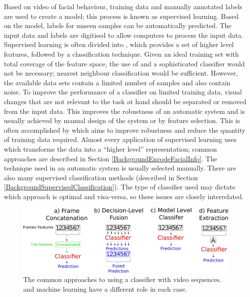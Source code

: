 Based on video of facial behaviour, training data and manually annotated labels are used to create a model; this process is known as supervised learning. Based on the model, labels for unseen samples can be automatically predicted. The input data and labels are digitised to allow computers to process the input data. Supervised learning is often divided into \featureGeneration, which provides a set of higher level features, followed by a classification technique. 
Given an ideal training set with total coverage of the feature space, the use of \featureGeneration and a sophisticated classifier would not be necessary; nearest neighbour classification \cite{Cover1967} would be sufficient. However, the available data sets contain a limited number of samples and also contain noise. To improve the performance of a classifier on limited training data, visual changes that are not relevant to the task at hand should be separated or removed from the input data. This improves the robustness of an automatic system and is usually achieved by manual design of the system or by feature selection. This is often accomplished by \featureGenerationComma which aims to improve robustness and reduce the quantity of training data required. Almost every application of supervised learning uses \featureGeneration which transforms the data into a ``higher level'' representation; common approaches are described in Section \ref{BackgroundEncodeFacialInfo}. The \featureGeneration technique used in an automatic system is usually selected manually. There are also many supervised classification methods (described in Section \ref{BackgroundSupervisedClassification}). The type of classifier used may dictate which \featureGeneration approach is optimal and visa-versa, so these issues are closely interrelated. %

\begin{figure}[tb]
\centering
\includegraphics[width = 0.9 \columnwidth]{nvcclass/VideoRecognition.pdf}
\caption[The common approaches to using a classifier with video sequences.]{The common approaches to using a classifier with video sequences. \FeatureGeneration and machine learning have a different role in each case.}
\label{FigureVideoRecognition}
\end{figure}

